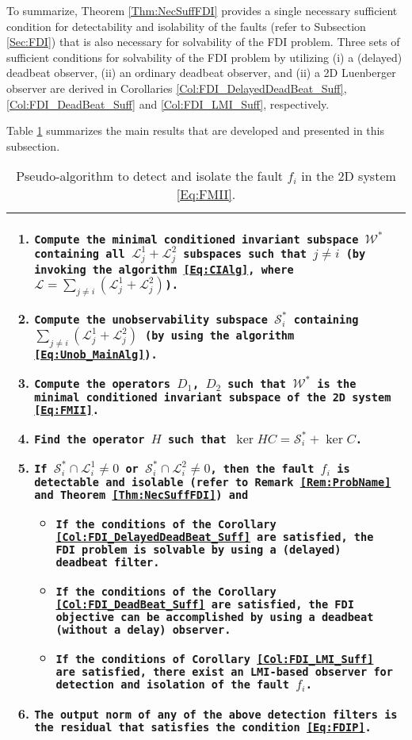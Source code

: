 \documentclass[journal,12pt,draftcls,onecolumn]{IEEEtran}
\newcommand{\ssp}[1]{\mathscr{#1}}      \newcommand{\setssp}[1]{\mathfrak{#1}}   \newcommand{\fld}[1]{\mathbb{#1}}       \newcommand{\op}[1]{\mathcal{#1}}       \newcommand{\sumbanach}[1]{\sum{#1}}
\begin{document}
To summarize, Theorem \ref{Thm:NecSuffFDI} provides a single necessary sufficient condition for  detectability and isolability  of the faults (refer to Subsection \ref{Sec:FDI}) that is also necessary for solvability of the FDI problem. Three sets of sufficient conditions for solvability of the FDI problem by utilizing (i) a (delayed) deadbeat observer, (ii) an ordinary deadbeat observer, and (ii) a 2D Luenberger observer are derived in Corollaries \ref{Col:FDI_DelayedDeadBeat_Suff},  \ref{Col:FDI_DeadBeat_Suff} and \ref{Col:FDI_LMI_Suff}, respectively.


Table \ref{Tab:Suff_Cond} summarizes the main results that are developed and presented in this subsection.
\begin{table}[h]
	\caption{Pseudo-algorithm to detect and isolate the fault $f_i$ in the 2D system \eqref{Eq:FMII}.}
	\centering
	\begin{tabularx}{1\columnwidth}{|X|}
		\hline
		\hline
		\begin{enumerate}
			\item {\tt Compute the minimal conditioned invariant subspace $\ssp{W}^*$ containing all $\ssp{L}_j^1+\ssp{L}_j^2$ subspaces such that $j\neq i$ (by invoking the algorithm \eqref{Eq:CIAlg}, where $\ssp{L}=\sum_{j\neq i} (\ssp{L}_j^1+\ssp{L}_j^2)$).}
			\item {\tt Compute the unobservability subspace $\op{S}_i^*$ containing $\sum_{j\neq i} (\ssp{L}_j^1+\ssp{L}_j^2)$ (by using the algorithm \eqref{Eq:Unob_MainAlg}).}
			\item {\tt Compute the operators $D_1$, $D_2$ such that $\ssp{W}^*$ is the minimal conditioned invariant subspace of the 2D system \eqref{Eq:FMII}.}
			\item {\tt Find the operator $H$ such that $\ker HC = \op{S}_i^*+\ker C$.}
			\item {\tt If $\op{S}_i^*\cap\ssp{L}_i^1\neq 0$ or $\op{S}_i^*\cap\ssp{L}_i^2\neq 0$, then the fault  $f_i$ is detectable and isolable (refer to Remark \ref{Rem:ProbName} and Theorem \ref{Thm:NecSuffFDI}) and }
			\begin{itemize}
				\item {\tt If the conditions of the Corollary \ref{Col:FDI_DelayedDeadBeat_Suff} are satisfied, the FDI problem is solvable by using a (delayed) deadbeat filter.}
				\item {\tt If the conditions of the Corollary \ref{Col:FDI_DeadBeat_Suff} are satisfied, the FDI objective can be accomplished by using a deadbeat (without a delay) observer.}
				\item {\tt If the conditions of Corollary \ref{Col:FDI_LMI_Suff} are satisfied, there exist an LMI-based observer for detection and isolation of the fault $f_i$.}
			\end{itemize}
			\item {\tt The  output norm of any of the above detection filters is the residual that satisfies the condition \eqref{Eq:FDIP}.}
		\end{enumerate}\\
		\hline
	\end{tabularx}
	\label{Tab:Suff_Cond}
\end{table}
\end{document}
